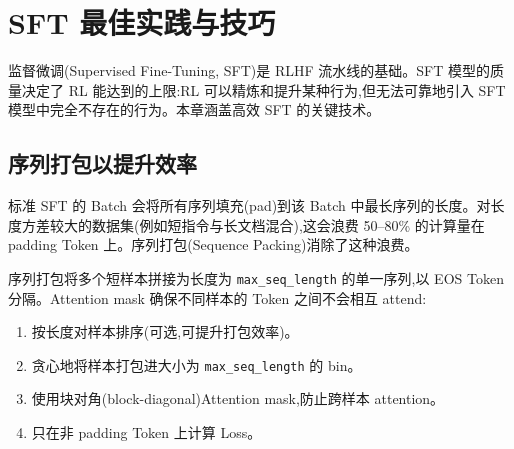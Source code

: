 \chapter{SFT 最佳实践与技巧}
\label{sec:sft-best-practices}

监督微调(Supervised Fine-Tuning, SFT)是 RLHF 流水线的基础。SFT 模型的质量决定了 RL 能达到的上限:RL 可以精炼和提升某种行为,但无法可靠地引入 SFT 模型中完全不存在的行为。本章涵盖高效 SFT 的关键技术。

\section{序列打包以提升效率}
\label{sec:sequence-packing}

\begin{intuitionbox}[Padding 问题]
标准 SFT 的 Batch 会将所有序列填充(pad)到该 Batch 中最长序列的长度。对长度方差较大的数据集(例如短指令与长文档混合),这会浪费 50--80\% 的计算量在 padding Token 上。序列打包(Sequence Packing)消除了这种浪费。
\end{intuitionbox}

序列打包将多个短样本拼接为长度为 \texttt{max\_seq\_length} 的单一序列,以 EOS Token 分隔。Attention mask 确保不同样本的 Token 之间不会相互 attend:

\begin{enumerate}
  \item 按长度对样本排序(可选,可提升打包效率)。
  \item 贪心地将样本打包进大小为 \texttt{max\_seq\_length} 的 bin。
  \item 使用块对角(block-diagonal)Attention mask,防止跨样本 attention。
  \item 只在非 padding Token 上计算 Loss。
\end{enumerate}

